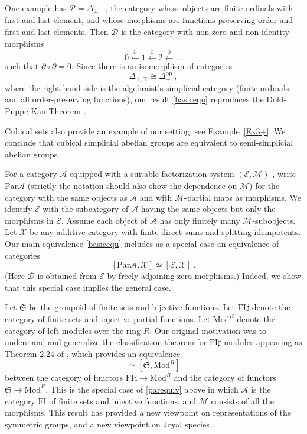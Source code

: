 \documentclass[a4paper,12pt,reqno]{amsart}
\theoremstyle{definition}
\theoremstyle{fact}
\theoremstyle{genquest}
\theoremstyle{step}
\newcommand{\lla}{\longleftarrow}
\newcommand{\ra}{\rightarrow}
\def\CA{{\mathscr A}}
\def\CD{{\mathscr D}}
\def\CE{{\mathscr E}}
\def\CM{{\mathscr M}}
\def\CP{{\mathscr P}}
\def\CX{{\mathscr X}}
\begin{document}
One example has $\CP = \Delta_{\bot,\top}$, the category whose objects are 
finite ordinals with first and last element, and whose morphisms are functions
preserving order and first and last elements. Then $\CD$ is the category with
non-zero and non-identity morphisms
\begin{equation*}
0\stackrel{\partial}\lla 1 \stackrel{\partial}\lla 2\stackrel{\partial}\lla \dots 
\end{equation*}
such that $\partial \circ \partial = 0$.
Since there is an isomorphism of categories 
\begin{equation}\label{interval}
\Delta_{\bot,\top} \cong \Delta_+^{\mathrm{op}} \ ,
\end{equation} 
where the right-hand side is the algebraist's simplicial category (finite ordinals
and all order-preserving functions),
our result \eqref{basicequ} reproduces the Dold-Puppe-Kan Theorem
\cite{Dold, DoldPuppe, Kan}.  

Cubical sets also provide an example of our setting; see Example~\ref{Ex3+}.
We conclude that cubical simplicial abelian groups are equivalent to semi-simplicial
abelian groups. 

For a category $\CA$ equipped with a suitable factorization system 
$(\CE,\CM)$ \cite{FreydKelly},
write $\mathrm{Par}\CA$ (strictly the notation should also show the dependence 
on $\CM$) for the category with the same objects as $\CA$ and
with $\CM$-partial maps as morphisms. We identify $\CE$ with the subcategory of
$\CA$ having the same objects but only the morphisms in $\CE$.
Assume each object of $\CA$ has only finitely many $\CM$-subobjects.
Let $\CX$ be any additive category with finite direct sums and splitting idempotents.
Our main equivalence \eqref{basicequ} includes as a special case an equivalence of categories
\begin{equation}\label{parequiv}
[\mathrm{Par}\CA,\CX] \simeq [\CE,\CX] \ .
\end{equation}
(Here $\CD$ is obtained from $\CE$ by freely adjoining zero morphisms.)
Indeed, we show that this special case implies the general case.

Let $\mathfrak{S}$ be the groupoid of finite sets and bijective functions.
Let $\mathrm{FI}\sharp$ denote the category of finite sets and injective partial functions.
Let $\mathrm{Mod}^R$ denote the category of left modules over the ring $R$.
Our original motivation was to understand and generalize the classification theorem for 
$\mathrm{FI}\sharp$-modules appearing as Theorem 2.24 of \cite{CEF2012},
which provides an equivalence 
\begin{equation*}
[\mathrm{FI}\sharp, \mathrm{Mod}^R] \simeq [\mathfrak{S}, \mathrm{Mod}^R]
\end{equation*}
between the category of functors $\mathrm{FI}\sharp \ra \mathrm{Mod}^R$
and the category of functors $\mathfrak{S} \ra \mathrm{Mod}^R$. 
This is the special case of \eqref{parequiv} above in which $\CA$ is
the category $\mathrm{FI}$ of finite sets and injective functions, 
and $\CM$ consists of all the morphisms. 
This result has provided a new viewpoint on representations of the 
symmetric groups, and a new viewpoint on Joyal species \cite{Species, AnalFunct}.
\end{document}
